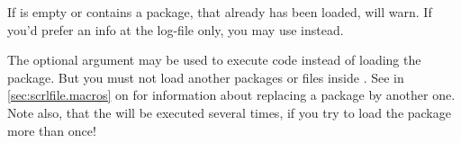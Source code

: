 If  is empty or contains a package, that already has been
loaded,  will warn. If you'd prefer an
info at the log-file only, you may use
 instead.

The optional argument may be used to
execute code instead of loading the package. But you must not load another
packages or files inside . See  in
\autoref{sec:scrlfile.macros} on
 for information about replacing
a package by another one. Note also, that the  will be
executed several times, if you try to load the package more than once!%
%

